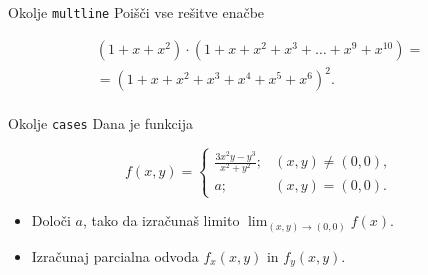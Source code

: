 \begin{frame}{Okolje \texttt{multline}}
	Poišči vse rešitve enačbe
	
	\begin{multline*}
		(1+x+x^2) \cdot (1+x+x^2+x^3+\ldots+x^9+x^{10}) = \\
	= (1+x+x^2+x^3+x^4+x^5+x^6)^2. \\
	\end{multline*}
\end{frame}

\begin{frame}{Okolje \texttt{cases}}
	Dana je funkcija
	
		
		$$
		f(x,y) = \begin{cases}
			\frac{3x^2y-y^3}{x^2+y^2}; & (x,y)\ne (0,0), \\
			a; & (x,y)=(0,0).
		\end{cases}
	$$
		
	\begin{itemize}
	\item Določi $a$, tako da izračunaš limito \( \lim_{(x,y)\to(0,0)} f(x). \)
	\item Izračunaj parcialna odvoda $f_x(x,y)$ in $f_y(x,y)$.
	\end{itemize}
\end{frame}
